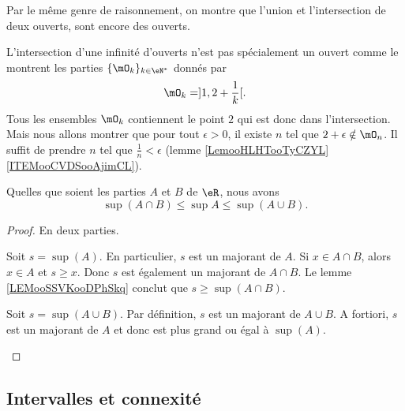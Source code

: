 Par le même genre de raisonnement, on montre que l'union et l'intersection de deux ouverts, sont encore des ouverts.

\begin{remark}
	L'intersection d'une infinité d'ouverts n'est pas spécialement un ouvert comme le montrent les parties \( \{ \mO_k \}_{k\in \eN^*}\) donnés par
	\begin{equation}
		\mO_k=]1,2+\frac{ 1 }{ k }[.
	\end{equation}
	Tous les ensembles \( \mO_k\) contiennent le point \( 2\) qui est donc dans l'intersection. Mais nous allons montrer que pour tout \( \epsilon>0\), il existe \( n\) tel que \( 2+\epsilon\notin\mO_n\). Il suffit de prendre \( n\) tel que \( \frac{1}{ n }<\epsilon\) (lemme \ref{LemooHLHTooTyCZYL}\ref{ITEMooCVDSooAjimCL}).
\end{remark}

\begin{proposition}     \label{PROPooANIOooIJHelX}
	Quelles que soient les parties \( A\) et \( B\) de \( \eR\), nous avons
	\begin{equation}
		\sup(A\cap B)\leq\sup A\leq\sup(A\cup B).
	\end{equation}
\end{proposition}

\begin{proof}
	En deux parties.
	\begin{subproof}
		Soit \( s=\sup(A)\). En particulier, \( s\) est un majorant de \( A\). Si \( x\in A\cap B\), alors \( x\in A\) et \( s\geq x\). Donc \( s\) est également un majorant de \( A\cap B\). Le lemme \ref{LEMooSSVKooDPhSkq} conclut que \( s\geq \sup(A\cap B)\).

		Soit \( s=\sup(A\cup B)\). Par définition, \( s\) est un majorant de \( A\cup B\). A fortiori, \( s\) est un majorant de \( A\) et donc est plus grand ou égal à \( \sup(A)\).
	\end{subproof}
\end{proof}

\subsection{Intervalles et connexité}

